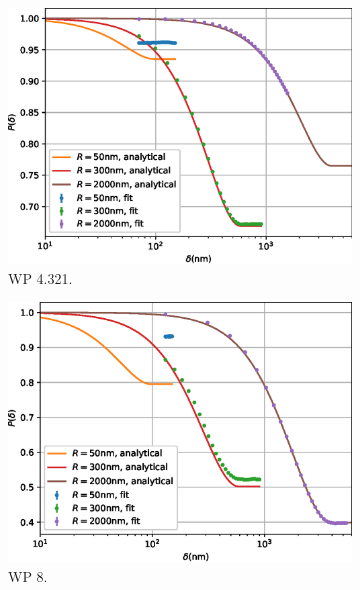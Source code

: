 \begin{figure}[p]
\begin{subfigure}[b]{0.45\textwidth}
		\includegraphics[width=\textwidth]{simulation-plot-gauss-WSP-4.321}
		\caption{WP 4.321.}
		\label{fig:simulation-plot-gauss-WSP-4.321}
	\end{subfigure}
	\hfill
	\begin{subfigure}[b]{0.45\textwidth}
		\centering
		\includegraphics[width=\textwidth]{simulation-plot-gauss-WSP-8}
		\caption{WP 8.}
		\label{fig:simulation-plot-gauss-WSP-8}
	\end{subfigure}
	\centering
	\begin{subfigure}[b]{0.45\textwidth}
		\centering

\end{subfigure}
\end{figure}
